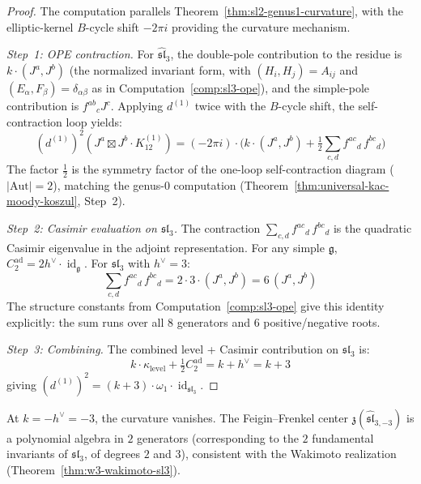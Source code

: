 \begin{proof}
The computation parallels Theorem~\ref{thm:sl2-genus1-curvature},
with the elliptic-kernel $B$-cycle shift $-2\pi i$ providing the
curvature mechanism.

\emph{Step~1: OPE contraction.}
For $\widehat{\mathfrak{sl}}_3$, the double-pole contribution to the residue is $k \cdot (J^a, J^b)$ (the normalized invariant form, with $(H_i, H_j) = A_{ij}$ and $(E_\alpha, F_\beta) = \delta_{\alpha\beta}$ as in Computation~\ref{comp:sl3-ope}), and the simple-pole contribution is $f^{ab}{}_{c} J^c$. Applying $d^{(1)}$ twice with the $B$-cycle shift, the self-contraction loop yields:
\begin{equation}
(d^{(1)})^2(J^a \boxtimes J^b \cdot K^{(1)}_{12}) = (-2\pi i) \cdot \bigl(k \cdot (J^a, J^b) + \tfrac{1}{2}\textstyle\sum_{c,d} f^{ac}{}_{d}\, f^{bc}{}_{d}\bigr)
\end{equation}
The factor $\frac{1}{2}$ is the symmetry factor of the one-loop self-contraction diagram ($|\mathrm{Aut}| = 2$), matching the genus-0 computation (Theorem~\ref{thm:universal-kac-moody-koszul}, Step~2).

\emph{Step~2: Casimir evaluation on $\mathfrak{sl}_3$.}
The contraction $\sum_{c,d} f^{ac}{}_{d}\, f^{bc}{}_{d}$ is the quadratic Casimir eigenvalue in the adjoint representation. For any simple $\mathfrak{g}$, $C_2^{\mathrm{ad}} = 2h^\vee \cdot \operatorname{id}_{\mathfrak{g}}$. For $\mathfrak{sl}_3$ with $h^\vee = 3$:
\begin{equation}
\textstyle\sum_{c,d} f^{ac}{}_{d}\, f^{bc}{}_{d} = 2 \cdot 3 \cdot (J^a, J^b) = 6\,(J^a, J^b)
\end{equation}
The structure constants from Computation~\ref{comp:sl3-ope} give this
identity explicitly: the sum runs over all $8$ generators and $6$
positive/negative roots.

\emph{Step~3: Combining.}
The combined level + Casimir contribution on $\mathfrak{sl}_3$ is:
\begin{equation}
k \cdot \kappa_{\mathrm{level}} + \tfrac{1}{2}C_2^{\mathrm{ad}} = k + h^\vee = k + 3
\end{equation}
giving $(d^{(1)})^2 = (k+3) \cdot \omega_1 \cdot \operatorname{id}_{\mathfrak{sl}_3}$.
\end{proof}

\begin{remark}
At $k = -h^\vee = -3$, the curvature vanishes. The Feigin--Frenkel center $\mathfrak{z}(\widehat{\mathfrak{sl}}_{3,-3})$ is a polynomial algebra in $2$ generators (corresponding to the $2$ fundamental invariants of $\mathfrak{sl}_3$, of degrees $2$ and $3$), consistent with the Wakimoto realization (Theorem~\ref{thm:w3-wakimoto-sl3}).
\end{remark}

